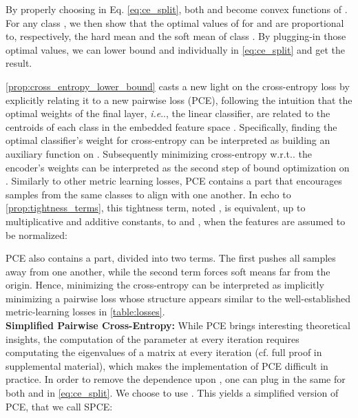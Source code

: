 \documentclass[runningheads]{llncs}
\makeatletter
\newcommand{\tran}{^\mathsf{T}}
\DeclareRobustCommand\onedot{\futurelet\@let@token\@onedot}
\def\@onedot{\ifx\@let@token.\else.\null\fi\xspace}
\def\ie{\emph{i.e}\onedot} \def\Ie{\emph{I.e}\onedot}
\def\wrt{w.r.t\onedot} \def\dof{d.o.f\onedot}
\makeatother
\begin{document}
By properly choosing  in Eq. \eqref{eq:ce_split}, both  and  become convex functions of . For any class , we then show that the optimal values of  for  and  are proportional to, respectively, the hard mean  and the soft mean  of class . By plugging-in those optimal values, we can lower bound  and  individually in \autoref{eq:ce_split} and get the result.


\autoref{prop:cross_entropy_lower_bound} casts a new light on the cross-entropy loss by explicitly relating it to a new pairwise loss (PCE), following the intuition that the optimal weights  of the final layer, \ie, the linear classifier, are related to the centroids of each class in the embedded feature space . Specifically, finding the optimal classifier's weight  for cross-entropy can be interpreted as building an auxiliary function  on . Subsequently minimizing cross-entropy \wrt the encoder's weights  can be interpreted as the second step of bound optimization on . 
Similarly to other metric learning losses, PCE contains a  part that encourages samples from the same classes to align with one another. In echo to \autoref{prop:tightness_terms}, this tightness term, noted , is equivalent, up to multiplicative and additive constants, to  and , when the features are assumed to be normalized:

 PCE also contains a  part, divided into two  terms. The first pushes all samples away from one another, while the second term forces soft means  far from the origin. Hence, minimizing the cross-entropy can be interpreted as implicitly minimizing a pairwise loss whose structure appears similar to the well-established metric-learning losses in \autoref{table:losses}. \\
 
 \textbf{Simplified Pairwise Cross-Entropy:} While PCE brings interesting theoretical insights, the computation of the parameter  at every iteration requires computating the eigenvalues of a  matrix at every iteration (cf. full proof in supplemental material), which makes the implementation of PCE difficult in practice.
In order to remove the dependence upon , one can plug in the same  for both  and  in \autoref{eq:ce_split}. We choose to use . This yields a simplified version of PCE, that we call SPCE:
\newcommand{\lspce}{\mathcal{L}_{SPCE} = \underbrace{-\frac{1}{n^2} \sum_{i=1}^n\sum_{j:y_j=y_i} \z_i\tran \z_j}_{\textsc{tightness}} + \underbrace{\frac{1}{n} \sum_{i=1}^n \log\sum_{k=1}^K \exp \Big(\frac{1}{n} \sum\limits_{j:y_j=k}\z_i\tran \z_j\Big)}_{\textsc{contrastive}}}
\end{document}

